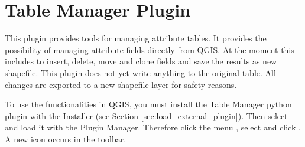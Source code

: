 
\section{Table Manager Plugin}\label{sec:ftools}


This plugin provides tools for managing attribute tables. It provides the
possibility of managing attribute fields directly from QGIS. At the moment
this includes to insert, delete, move and clone fields and save the results
as new shapefile. This plugin does not yet write anything to the original
table. All changes are exported to a new shapefile layer for safety reasons.


To use the functionalities in QGIS, you must install the Table Manager python
plugin with the  Installer (see Section
\ref{sec:load_external_plugin}). Then select and load it with the Plugin Manager.
Therefore click the menu  \arrow
{}, select  and click
. A new  icon occurs
in the toolbar.

